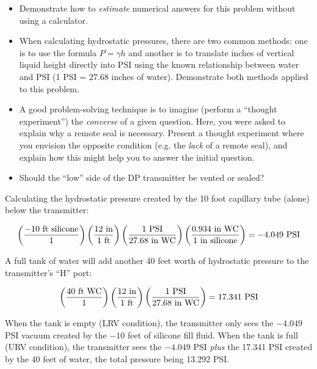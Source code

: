 \begin{itemize}
\item{} Demonstrate how to {\it estimate} numerical answers for this problem without using a calculator.
\item{} When calculating hydrostatic pressures, there are two common methods: one is to use the formula $P = \gamma h$ and another is to translate inches of vertical liquid height directly into PSI using the known relationship between water and PSI (1 PSI = 27.68 inches of water).  Demonstrate both methods applied to this problem.
\item{} A good problem-solving technique is to imagine (perform a ``thought experiment'') the {\it converse} of a given question.  Here, you were asked to explain why a remote seal is necessary.  Present a thought experiment where you envision the opposite condition (e.g. the {\it lack} of a remote seal), and explain how this might help you to answer the initial question.
\item{} Should the ``low'' side of the DP transmitter be vented or sealed?
\end{itemize}













Calculating the hydrostatic pressure created by the 10 foot capillary tube (alone) below the transmitter:

$$\left(-10 \hbox{ ft silicone} \over 1 \right) \left(12 \hbox{ in} \over 1 \hbox{ ft} \right) \left(1 \hbox{ PSI} \over 27.68 \hbox{ in WC} \right) \left(0.934 \hbox{ in WC} \over 1 \hbox{ in silicone} \right) = -4.049 \hbox{ PSI}$$

\vskip 10pt

A full tank of water will add another 40 feet worth of hydrostatic pressure to the transmitter's ``H'' port:

$$\left(40 \hbox{ ft WC} \over 1 \right) \left(12 \hbox{ in} \over 1 \hbox{ ft} \right) \left(1 \hbox{ PSI} \over 27.68 \hbox{ in WC} \right) = 17.341 \hbox{ PSI}$$

\vskip 10pt

When the tank is empty (LRV condition), the transmitter only sees the $-4.049$ PSI vacuum created by the $-10$ feet of silicone fill fluid.  When the tank is full (URV condition), the transmitter sees the $-4.049$ PSI {\it plus} the 17.341 PSI created by the 40 feet of water, the total pressure being 13.292 PSI.

